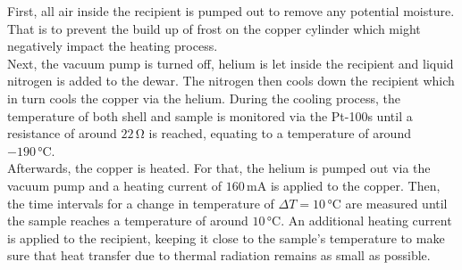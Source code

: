 First, all air inside the recipient is pumped out to remove any potential moisture. That is to prevent the build up of frost on the copper cylinder which might negatively impact the heating process. \\
Next, the vacuum pump is turned off, helium is let inside the recipient and liquid nitrogen is added to the dewar.
The nitrogen then cools down the recipient which in turn cools the copper via the helium.
During the cooling process, the temperature of both shell and sample is monitored via the Pt-100s until a resistance of around $22 \,\si{\ohm}$ is reached, equating to a temperature of around $-190 \,\si{\celsius}$. \\

Afterwards, the copper is heated. For that, the helium is pumped out via the vacuum pump and a heating current of $160 \,\si{\milli\ampere}$ is applied to the copper.
Then, the time intervals for a change in temperature of $\Delta T = 10 \,\si{\celsius}$ are measured until the sample reaches a temperature of around $10 \,\si{\celsius}$.
An additional heating current is applied to the recipient, keeping it close to the sample's temperature to make sure that heat transfer due to thermal radiation remains as small as possible.
